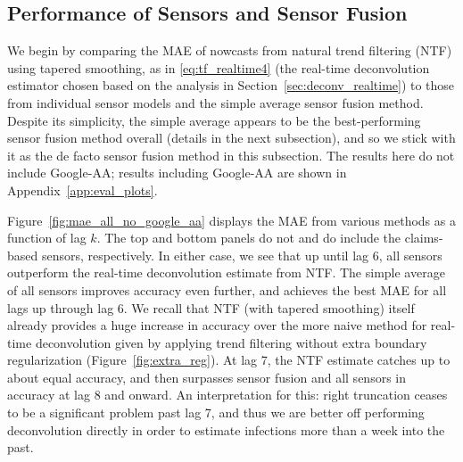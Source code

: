 \documentclass[sts]{imsart}
\theoremstyle{plain}
\theoremstyle{definition}
\theoremstyle{remark}
\begin{document}
\subsection{Performance of Sensors and Sensor Fusion}

We begin by comparing the MAE of nowcasts from natural trend filtering (NTF) 
using tapered smoothing, as in \eqref{eq:tf_realtime4} (the real-time
deconvolution estimator chosen based on the analysis in
Section~\ref{sec:deconv_realtime}) to those from individual sensor models and
the simple average sensor fusion method. Despite its simplicity, the simple
average appears to be the best-performing sensor fusion method overall (details
in the next subsection), and so we stick with it as the de facto sensor fusion
method in this subsection. The results here do not include Google-AA; results
including Google-AA are shown in Appendix~\ref{app:eval_plots}. 

Figure~\ref{fig:mae_all_no_google_aa} displays the MAE from various methods as
a function of lag $k$. The top and bottom panels do not and do include the 
claims-based sensors, respectively. In either case, we see that up until
lag 6, all sensors outperform the real-time deconvolution estimate from NTF. The
simple average of all sensors improves accuracy even further, and achieves the
best MAE for all lags up through lag 6. We recall that NTF (with tapered
smoothing) itself already provides a huge increase in accuracy over the more
naive method for real-time deconvolution given by applying trend filtering
without extra boundary regularization (Figure~\ref{fig:extra_reg}). 
At lag 7, the NTF estimate catches up to about equal accuracy, and then
surpasses sensor fusion and all sensors in accuracy at lag 8 and onward. An
interpretation for this: right truncation ceases to be a significant problem
past lag 7, and thus we are better off performing deconvolution directly in
order to estimate infections more than a week into the past.   
\end{document}
